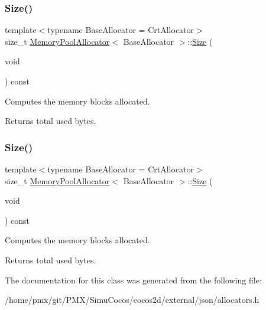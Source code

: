\subsubsection{\texorpdfstring{Size()}{Size()}\hspace{0.1cm}{\footnotesize\ttfamily [1/2]}}
{\footnotesize\ttfamily template$<$typename Base\+Allocator = Crt\+Allocator$>$ \\
size\+\_\+t \hyperlink{classMemoryPoolAllocator}{Memory\+Pool\+Allocator}$<$ Base\+Allocator $>$\+::\hyperlink{classSize}{Size} (\begin{DoxyParamCaption}\item[{void}]{ }\end{DoxyParamCaption}) const\hspace{0.3cm}{\ttfamily [inline]}}



Computes the memory blocks allocated. 

\begin{DoxyReturn}{Returns}
total used bytes. 
\end{DoxyReturn}
\mbox{\label{classMemoryPoolAllocator_ae7fcf0341c13e899cf488bc7c8949956}} 
\subsubsection{\texorpdfstring{Size()}{Size()}\hspace{0.1cm}{\footnotesize\ttfamily [2/2]}}
{\footnotesize\ttfamily template$<$typename Base\+Allocator = Crt\+Allocator$>$ \\
size\+\_\+t \hyperlink{classMemoryPoolAllocator}{Memory\+Pool\+Allocator}$<$ Base\+Allocator $>$\+::\hyperlink{classSize}{Size} (\begin{DoxyParamCaption}\item[{void}]{ }\end{DoxyParamCaption}) const\hspace{0.3cm}{\ttfamily [inline]}}



Computes the memory blocks allocated. 

\begin{DoxyReturn}{Returns}
total used bytes. 
\end{DoxyReturn}


The documentation for this class was generated from the following file\+:\begin{DoxyCompactItemize}
\item 
/home/pmx/git/\+P\+M\+X/\+Simu\+Cocos/cocos2d/external/json/allocators.\+h\end{DoxyCompactItemize}
